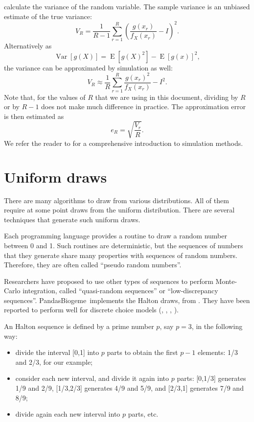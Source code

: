 \documentclass[12pt,a4paper]{article}
\newcommand{\expect}{\operatorname{E}}
\newcommand{\var}{\operatorname{Var}}
\newcommand{\PBIOGEME}{PandasBiogeme}
\begin{document}
calculate the variance of the random variable.
The sample variance is an unbiased estimate of the true variance:
\begin{equation}
V_R = \frac{1}{R-1} \sum_{r=1}^R (\frac{g(x_r)}{f_X(x_r)} - I)^2.
\end{equation}
Alternatively as 
\begin{equation}
\var[g(X)] = \expect[g(X)^2] - \expect[g(x)]^2,
\end{equation}
the variance can be approximated by simulation as well:
\begin{equation}
\label{eq:simulatedVariance}
V_R \approx \frac{1}{R} \sum_{r=1}^R \frac{g(x_r)^2}{f_X(x_r)} -
I^2.
\end{equation}
Note that, for the values of $R$ that we are using in this document,
dividing by $R$ or by $R-1$ does not make much difference in practice. The approximation error is then estimated as
\begin{equation}
\label{eq:stderr}
e_R = \sqrt{\frac{V_r}{R}}.
\end{equation}
We refer the reader to  for a comprehensive
introduction to simulation methods. 

\section{Uniform draws}
\label{sec:uniform}
There are many algorithms  to draw from various
distributions. All of them require at some point draws from the
uniform distribution. There are several techniques that generate such
uniform draws. 

Each programming language provides a routine to
draw a random number between 0 and 1. Such routines are
deterministic, but the sequences of numbers that they generate share
many properties with sequences of random numbers. Therefore, they are
often called ``pseudo random numbers''.

Researchers have proposed to use other types of sequences to perform
Monte-Carlo integration, called ``quasi-random sequences'' or
``low-discrepancy sequences''. \PBIOGEME\ implements the Halton draws,
from .  They have been reported to perform well for
discrete choice models (\cite{Trai2000}, \cite{Bhat2001},
\cite{Bhat2003837}, \cite{Sandor2004313}).

An Halton sequence is defined by a prime number $p$, say $p=3$, in the
following way:
\begin{itemize}
\item divide the interval [0,1] into $p$ parts to obtain  the first
  $p-1$ elements: 1/3 and 2/3, for our example;
\item consider each new interval, and divide it again into $p$ parts:
  [0,1/3] generates 1/9 and 2/9, [1/3,2/3] generates 4/9 and 5/9, and
  [2/3,1] generates 7/9 and 8/9;
\item divide again each new interval into $p$ parts, etc.
\end{itemize}
\end{document}
